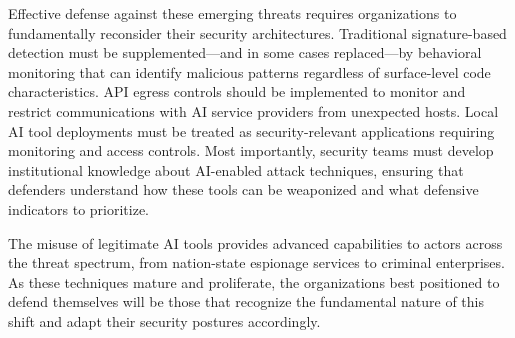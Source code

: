 \documentclass[12pt,a4paper]{article}
\begin{document}
Effective defense against these emerging threats requires organizations to fundamentally reconsider their security architectures. Traditional signature-based detection must be supplemented—and in some cases replaced—by behavioral monitoring that can identify malicious patterns regardless of surface-level code characteristics. API egress controls should be implemented to monitor and restrict communications with AI service providers from unexpected hosts. Local AI tool deployments must be treated as security-relevant applications requiring monitoring and access controls. Most importantly, security teams must develop institutional knowledge about AI-enabled attack techniques, ensuring that defenders understand how these tools can be weaponized and what defensive indicators to prioritize.

The misuse of legitimate AI tools provides advanced capabilities to actors across the threat spectrum, from nation-state espionage services to criminal enterprises. As these techniques mature and proliferate, the organizations best positioned to defend themselves will be those that recognize the fundamental nature of this shift and adapt their security postures accordingly.

\newpage
\nocite{*}
\printbibliography[heading=bibintoc,title={References}]
\end{document}
